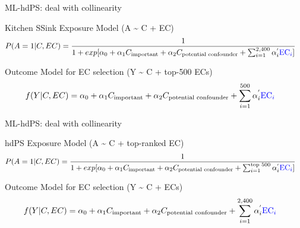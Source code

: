 \documentclass[
  ignorenonframetext,
  aspectratio=169]{beamer}
\begin{document}
\begin{frame}{ML-hdPS: deal with collinearity}
\protect\hypertarget{ml-hdps-deal-with-collinearity}{}
\begin{block}{Kitchen SSink Exposure Model (A \textasciitilde{} C + EC)}
\protect\hypertarget{kitchen-ssink-exposure-model-a-c-ec}{}
\begin{equation}
\begin{aligned}
P(A=1|C, EC) &= \frac{1}{1+exp[\alpha_0 + \alpha_1 C_{\text{important}} + \alpha_2 C_{\text{potential confounder}} +  \sum_{i=1}^{2,400} \alpha_i^{'} \textcolor{blue}{\text{EC}_i} ]}\nonumber
\end{aligned}
\end{equation}
\end{block}

\begin{block}{Outcome Model for EC selection (Y \textasciitilde{} C +
top-500 ECs)}
\protect\hypertarget{outcome-model-for-ec-selection-y-c-top-500-ecs}{}
\begin{equation}
\begin{aligned}
f(Y|C, EC) &= \alpha_0 + \alpha_1 C_{\text{important}} + \alpha_2 C_{\text{potential confounder}} +  \sum_{i=1}^{500} \alpha_i^{'} \textcolor{blue}{\text{EC}_i} \nonumber
\end{aligned}
\end{equation}
\end{block}
\end{frame}

\begin{frame}{ML-hdPS: deal with collinearity}
\protect\hypertarget{ml-hdps-deal-with-collinearity-1}{}
\begin{block}{hdPS Exposure Model (A \textasciitilde{} C + top-ranked
EC)}
\protect\hypertarget{hdps-exposure-model-a-c-top-ranked-ec}{}
\begin{equation}
\begin{aligned}
P(A=1|C, EC) &= \frac{1}{1+exp[\alpha_0 + \alpha_1 C_{\text{important}} + \alpha_2 C_{\text{potential confounder}} +  \sum_{i=1}^{\text{top 500}} \alpha_i^{'} \textcolor{blue}{\text{EC}_i} ]}\nonumber
\end{aligned}
\end{equation}
\end{block}

\begin{block}{Outcome Model for EC selection (Y \textasciitilde{} C +
ECs)}
\protect\hypertarget{outcome-model-for-ec-selection-y-c-ecs}{}
\begin{equation}
\begin{aligned}
f(Y|C, EC) &= {\alpha_0 + \alpha_1 C_{\text{important}} + \alpha_2 C_{\text{potential confounder}} +  \sum_{i=1}^{2,400} \alpha_i^{'} \textcolor{blue}{\text{EC}_i} }\nonumber
\end{aligned}
\end{equation}
\end{block}
\end{frame}
\end{document}
